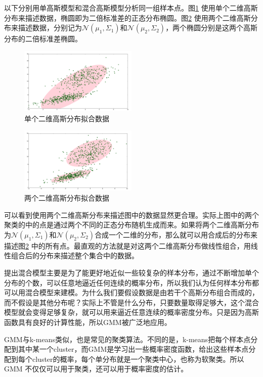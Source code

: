 \documentclass[UTF8]{ctexart}
\begin{document}
以下分别用单高斯模型和混合高斯模型分析同一组样本点。图\ref{SGM-model} 使用单个二维高斯分布来描述数据，椭圆即为二倍标准差的正态分布椭圆。图\ref{GMM-model} 使用两个二维高斯分布来描述数据，分别记为$\mathcal N({\mu}_1,{\Sigma}_1)$和$\mathcal N({\mu}_2,{\Sigma}_2)$，两个椭圆分别是这两个高斯分布的二倍标准差椭圆。
\begin{figure}[!h]
  \includegraphics[width=0.5\textwidth]{./figures/SGM.jpg}
  \centering
  \caption{单个二维高斯分布拟合数据}
  \label{SGM-model}
\end{figure}
\begin{figure}[!h]
  \includegraphics[width=0.5\textwidth]{./figures/GMM.jpg}
  \centering
  \caption{两个二维高斯分布拟合数据}
  \label{GMM-model}
\end{figure}

可以看到使用两个二维高斯分布来描述图中的数据显然更合理。实际上图中的两个聚类的中的点是通过两个不同的正态分布随机生成而来。如果将两个二维高斯分布为$\mathcal N({\mu}_1,{\Sigma}_1)$和$\mathcal N({\mu}_2,{\Sigma}_2)$合成一个二维的分布，那么就可以用合成后的分布来描述图\ref{GMM-model} 中的所有点。最直观的方法就是对这两个二维高斯分布做线性组合，用线性组合后的分布来描述整个集合中的数据。

提出混合模型主要是为了能更好地近似一些较复杂的样本分布，通过不断增加单个分布的个数，可以任意地逼近任何连续的概率分布，所以我们认为任何样本分布都可以用混合模型来建模。为什么我们要假设数据是由若干个高斯分布组合而成的，而不假设是其他分布呢？实际上不管是什么分布，只要数量取得足够大，这个混合模型就会变得足够复杂，就可以用来逼近任意连续的概率密度分布。只是因为高斯函数具有良好的计算性能，所以GMM被广泛地应用。

GMM与k-means类似，也是常见的聚类算法。不同的是，k-means把每个样本点分配到其中某一个cluster，而GMM是学习出一些概率密度函数，给出这些样本点分配到每个cluster的概率，每个单分布就是一个聚类中心，也称为软聚类。所以GMM 不仅仅可以用于聚类，还可以用于概率密度的估计。
\end{document}
